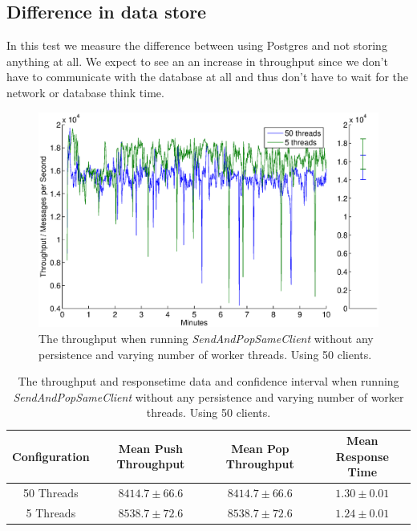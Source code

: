 \documentclass{article}
\begin{document}
        \subsection{Difference in data store}
            In this test we measure the difference between using Postgres and not storing anything at all. We expect to see an an increase in throughput since we don't have to communicate with the database at all and thus don't have to wait for the network or database think time.
            
            \begin{figure}[H]
                \hspace{-1.5cm}
                \includegraphics[scale=0.40]{throughput_i-fooled-you_50-5-threads-50-clients-1kB-msg}
                \caption{The throughput when running \textit{SendAndPopSameClient} without any persistence and varying number of worker threads. Using 50 clients.}
                \label{fig:throughput_i-fooled-you_50-5-threads-50-clients-1kB-msg.eps}
                \end{figure}
            
            \begin{table}
            \begin{tabular}{|c|c|c|c|}
            \hline 
            Configuration & Mean Push Throughput & Mean Pop Throughput & Mean Response Time \\ 
            \hline 
            50 Threads & $8414.7 \pm 66.6$ & $8414.7 \pm 66.6$ & $1.30 \pm 0.01$ \\ 
            \hline 
            5 Threads & $8538.7 \pm 72.6$ & $8538.7 \pm 72.6$ & $1.24 \pm 0.01$ \\ 
            \hline 
            \end{tabular} 
                \caption{The throughput and responsetime data and confidence interval when running \textit{SendAndPopSameClient} without any persistence and varying number of worker threads. Using 50 clients.}
                \label{tbl:throughput_i-fooled-you_50-5-threads-50-clients-1kB-msg.eps}
            \end{table}
            
\end{document}
